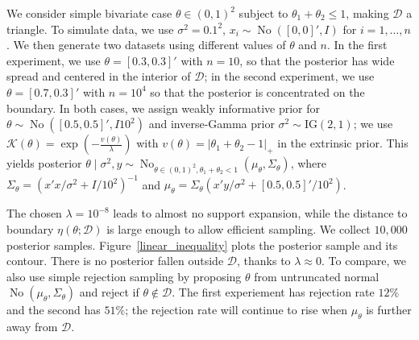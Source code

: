 \documentclass[10pt]{article}
\newcommand{\mc}[1]{\mathcal{#1}}
\DeclareMathOperator{\No}{No}
\DeclareMathOperator{\1}{\mathbbm{1}}
\begin{document}
We consider simple bivariate case $\theta \in (0,1)^2$ subject to $\theta_1+\theta_2\le 1$, making $\mc D$ a triangle. To simulate data, we use $\sigma^2=0.1^2$, $x_i\sim \No([0,0]',I)$ for $i=1,\ldots,n$. We then generate two datasets using different values of $\theta$ and $n$. In the first experiment, we use $\theta=[0.3,0.3]'$ with $n=10$, so that the posterior has wide spread and centered in the interior of $\mc D$; in the second experiment, we use $\theta=[0.7,0.3]'$ with $n=10^4$ so that the posterior is concentrated on the boundary. In both cases, we assign weakly informative prior for $\theta\sim \No([0.5, 0.5]',I10^2)$ and inverse-Gamma prior $\sigma^2\sim \text{IG}(2,1)$; we use $\mc K(\theta)=\exp( - \frac{v(\theta)}{\lambda})$ with $v(\theta)=|\theta_1+\theta_2-1|_{+}$ in the extrinsic prior. This yields posterior $\theta\mid \sigma^2,y \sim \No_{\theta\in(0,1)^2,\theta_1+\theta_2<1} \left( \mu_\theta, \Sigma_\theta\right)$, where $\Sigma_\theta=(x'x/\sigma^2+I/10^2)^{-1}$ and $\mu_\theta= \Sigma_\theta(x'y/\sigma^2 + [0.5,0.5]'/10^2)$. 

The chosen $\lambda=10^{-8}$ leads to almost no support expansion, while the distance to boundary $\eta(\theta;\mc D)$ is large enough to allow efficient sampling. We collect $10,000$ posterior samples. Figure~\ref{linear_inequality} plots the posterior sample and its contour. There is no posterior fallen outside $\mc D$, thanks to $\lambda\approx 0$. To compare, we also use simple rejection sampling by proposing $\theta$ from untruncated normal $\No \left( \mu_\theta, \Sigma_\theta\right)$ and reject if $\theta\not\in \mc D$. The first experiement has rejection rate $12\%$  and the second has $51\%$; the rejection rate will continue to rise when $\mu_\theta$ is further away from $\mc D$.
\end{document}
